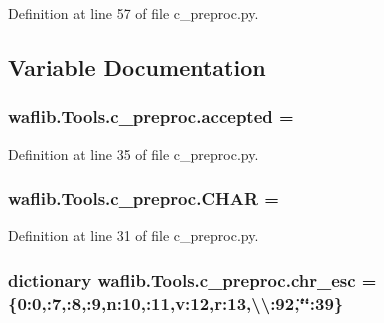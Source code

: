 Definition at line 57 of file c\+\_\+preproc.\+py.



\subsection{Variable Documentation}
\subsubsection[{\texorpdfstring{accepted}{accepted}}]{ waflib.\+Tools.\+c\+\_\+preproc.\+accepted = \textquotesingle{}}\hypertarget{namespacewaflib_1_1_tools_1_1c__preproc_a9d250f80da040a2cb1b7e5c35e2e4e35}{}\label{namespacewaflib_1_1_tools_1_1c__preproc_a9d250f80da040a2cb1b7e5c35e2e4e35}


Definition at line 35 of file c\+\_\+preproc.\+py.

\subsubsection[{\texorpdfstring{C\+H\+AR}{CHAR}}]{ waflib.\+Tools.\+c\+\_\+preproc.\+C\+H\+AR = \textquotesingle{}}\hypertarget{namespacewaflib_1_1_tools_1_1c__preproc_a0d7ac303cd71290620817e2dc467f221}{}\label{namespacewaflib_1_1_tools_1_1c__preproc_a0d7ac303cd71290620817e2dc467f221}


Definition at line 31 of file c\+\_\+preproc.\+py.

\subsubsection[{\texorpdfstring{chr\+\_\+esc}{chr_esc}}]{\setlength{\rightskip}{0pt plus 5cm}dictionary waflib.\+Tools.\+c\+\_\+preproc.\+chr\+\_\+esc = \{\textquotesingle{}0\textquotesingle{}\+:0,\textquotesingle{}\+:7,\textquotesingle{}\+:8,\textquotesingle{}\+:9,\textquotesingle{}n\textquotesingle{}\+:10,\textquotesingle{}\+:11,\textquotesingle{}v\textquotesingle{}\+:12,\textquotesingle{}r\textquotesingle{}\+:13,\textquotesingle{}\textbackslash{}\textbackslash{}\textquotesingle{}\+:92,\char`\"{}\textquotesingle{}\char`\"{}\+:39\}}\hypertarget{namespacewaflib_1_1_tools_1_1c__preproc_acdd54e07b79f803e6c42e195e8b76f1c}{}\label{namespacewaflib_1_1_tools_1_1c__preproc_acdd54e07b79f803e6c42e195e8b76f1c}


